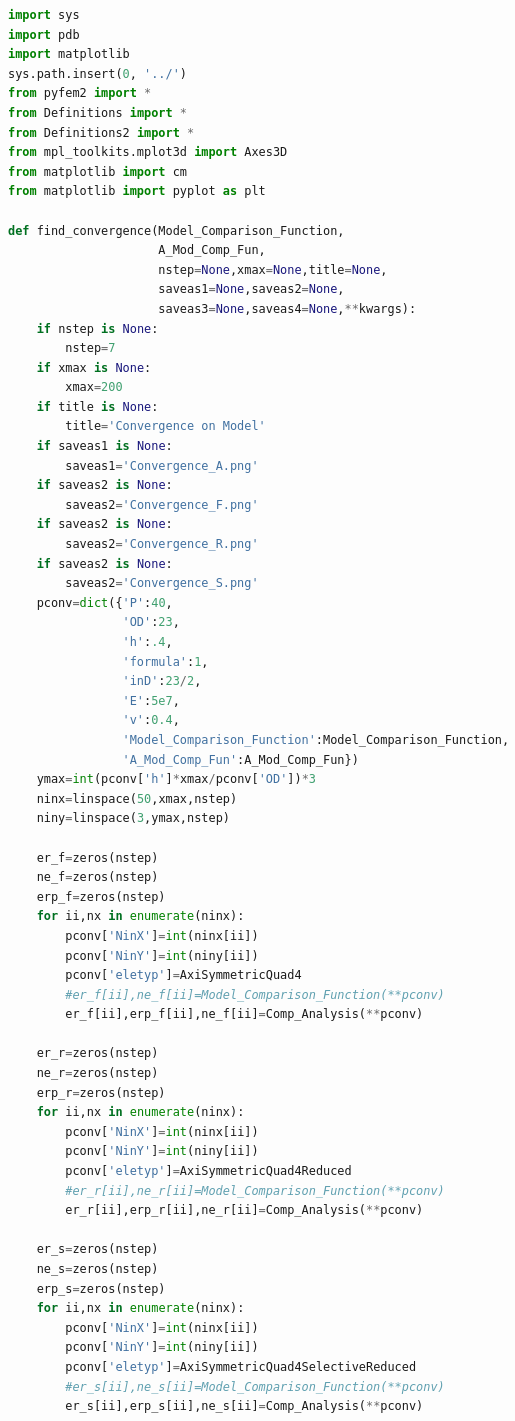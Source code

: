 \documentclass[10pt,letterpaper]{report}
\numberwithin{equation}{chapter}
\begin{document}
\begin{lstlisting}[language=Python]
import sys
import pdb
import matplotlib
sys.path.insert(0, '../')
from pyfem2 import *
from Definitions import *
from Definitions2 import *
from mpl_toolkits.mplot3d import Axes3D
from matplotlib import cm
from matplotlib import pyplot as plt

def find_convergence(Model_Comparison_Function,
                     A_Mod_Comp_Fun,
                     nstep=None,xmax=None,title=None,
                     saveas1=None,saveas2=None,
                     saveas3=None,saveas4=None,**kwargs):
    if nstep is None:
        nstep=7
    if xmax is None:
        xmax=200
    if title is None:
        title='Convergence on Model'
    if saveas1 is None:
        saveas1='Convergence_A.png'
    if saveas2 is None:
        saveas2='Convergence_F.png'
    if saveas2 is None:
        saveas2='Convergence_R.png'
    if saveas2 is None:
        saveas2='Convergence_S.png'
    pconv=dict({'P':40,
                'OD':23,
                'h':.4,
                'formula':1,
                'inD':23/2,
                'E':5e7,
                'v':0.4,
                'Model_Comparison_Function':Model_Comparison_Function,
                'A_Mod_Comp_Fun':A_Mod_Comp_Fun})
    ymax=int(pconv['h']*xmax/pconv['OD'])*3
    ninx=linspace(50,xmax,nstep)
    niny=linspace(3,ymax,nstep)
    
    er_f=zeros(nstep)
    ne_f=zeros(nstep)
    erp_f=zeros(nstep)
    for ii,nx in enumerate(ninx):
        pconv['NinX']=int(ninx[ii])
        pconv['NinY']=int(niny[ii])
        pconv['eletyp']=AxiSymmetricQuad4
        #er_f[ii],ne_f[ii]=Model_Comparison_Function(**pconv)
        er_f[ii],erp_f[ii],ne_f[ii]=Comp_Analysis(**pconv)
        
    er_r=zeros(nstep)
    ne_r=zeros(nstep)
    erp_r=zeros(nstep)
    for ii,nx in enumerate(ninx):
        pconv['NinX']=int(ninx[ii])
        pconv['NinY']=int(niny[ii])
        pconv['eletyp']=AxiSymmetricQuad4Reduced
        #er_r[ii],ne_r[ii]=Model_Comparison_Function(**pconv)
        er_r[ii],erp_r[ii],ne_r[ii]=Comp_Analysis(**pconv)
        
    er_s=zeros(nstep)
    ne_s=zeros(nstep)
    erp_s=zeros(nstep)
    for ii,nx in enumerate(ninx):
        pconv['NinX']=int(ninx[ii])
        pconv['NinY']=int(niny[ii])
        pconv['eletyp']=AxiSymmetricQuad4SelectiveReduced
        #er_s[ii],ne_s[ii]=Model_Comparison_Function(**pconv)
        er_s[ii],erp_s[ii],ne_s[ii]=Comp_Analysis(**pconv)
    

\end{lstlisting}
\end{document}
